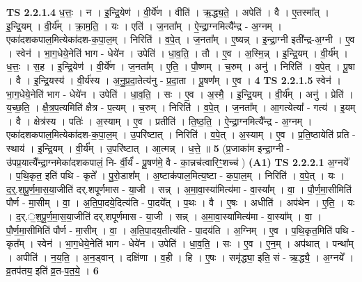 \documentclass[17pt]{extarticle}
\begin{document}
                  \newline
                                \textbf{ TS 2.2.1.4} \newline
                  ध॒त्तः॒ । न । इ॒न्द्रि॒येण॑ । वी॒र्ये॑ण । वीति॑ । ऋ॒द्ध्य॒ते॒ । अपेति॑ । वै । ए॒तस्मा᳚त् । इ॒न्द्रि॒यम् । वी॒र्य᳚म् । क्रा॒म॒ति॒ । यः । एति॑ । ज॒नता᳚म् । ऐ॒न्द्रा॒ग्नमित्यै᳚न्द्र - अ॒ग्नम् । एका॑दशकपाल॒मित्येका॑दश-क॒पा॒ल॒म् । निरिति॑ । व॒पे॒त् । ज॒नता᳚म् । ए॒ष्यन्न् । इ॒न्द्रा॒ग्नी इती᳚न्द्र-अ॒ग्नी । ए॒व । स्वेन॑ । भा॒ग॒धेये॒नेति॑ भाग - धेये॑न । उपेति॑ । धा॒व॒ति॒ । तौ । ए॒व । अ॒स्मि॒न्न् । इ॒न्द्रि॒यम् । वी॒र्य᳚म् । ध॒त्तः॒ । स॒ह । इ॒न्द्रि॒येण॑ । वी॒र्ये॑ण । ज॒नता᳚म् । ए॒ति॒ । पौ॒ष्णम् । च॒रुम् । अनु॑ । निरिति॑ । व॒पे॒त् । पू॒षा । वै । इ॒न्द्रि॒यस्य॑ । वी॒र्य॑स्य । अ॒नु॒प्र॒दा॒तेत्य॑नु - प्र॒दा॒ता । पू॒षण᳚म् । ए॒व । \textbf{  4} \newline
                  \newline
                                \textbf{ TS 2.2.1.5} \newline
                  स्वेन॑ । भा॒ग॒धेये॒नेति॑ भाग - धेये॑न । उपेति॑ । धा॒व॒ति॒ । सः । ए॒व । अ॒स्मै॒ । इ॒न्द्रि॒यम् । वी॒र्य᳚म् । अनु॑ । प्रेति॑ । य॒च्छ॒ति॒ । क्षै॒त्र॒प॒त्यमिति॑ क्षैत्र - प॒त्यम् । च॒रुम् । निरिति॑ । व॒पे॒त् । ज॒नता᳚म् । आ॒गत्येत्या᳚ - गत्य॑ । इ॒यम् । वै । क्षेत्र॑स्य । पतिः॑ । अ॒स्याम् । ए॒व । प्रतीति॑ । ति॒ष्ठ॒ति॒ । ऐ॒न्द्रा॒ग्नमित्यै᳚न्द्र - अ॒ग्नम् । एका॑दशकपाल॒मित्येका॑दश-क॒पा॒ल॒म् । उ॒परि॑ष्टात् । निरिति॑ । व॒पे॒त् । अ॒स्याम् । ए॒व । प्र॒ति॒ष्ठायेति॑ प्रति - स्थाय॑ । इ॒न्द्रि॒यम् । वी॒र्य᳚म् । उ॒परि॑ष्टात् । आ॒त्मन्न् । ध॒त्ते॒ ॥ \textbf{  5} \newline
                  \newline
                      (प्र॒जाका॑म इन्द्रा॒ग्नी - उ॑पप्र॒यात्यै᳚न्द्रा॒ग्नमेका॑दशकपालं॒ नि- र्वी॒र्यं॑ - पू॒षण॑मे॒ वै - का॒न्नच॑त्वारिꣳ॒॒शच्च॑ )  \textbf{(A1)} \newline \newline
                                \textbf{ TS 2.2.2.1} \newline
                  अ॒ग्नये᳚ । प॒थि॒कृत॒ इति॑ पथि - कृते᳚ । पु॒रो॒डाश᳚म् । अ॒ष्टाक॑पाल॒मित्य॒ष्टा - क॒पा॒ल॒म् । निरिति॑ । व॒पे॒त् । यः । द॒र्॒.श॒पू॒र्ण॒मा॒स॒या॒जीति॑ दर्.शपूर्णमास - या॒जी । सन्न् । अ॒मा॒वा॒स्या॑मित्य॑मा - वा॒स्या᳚म् । वा॒ । पौ॒र्ण॒मा॒सीमिति॑ पौर्ण - मा॒सीम् । वा॒ । अ॒ति॒पा॒दये॒दित्य॑ति - पा॒दये᳚त् । प॒थः । वै । ए॒षः । अधीति॑ । अप॑थेन । ए॒ति॒ । यः । द॒र्.॒श॒पू॒र्ण॒मा॒स॒या॒जीति॑ दर्.शपूर्णमास - या॒जी । सन्न् । अ॒मा॒वा॒स्या॑मित्य॑मा - वा॒स्या᳚म् । वा॒ । पौ॒र्ण॒मा॒सीमिति॑ पौर्ण - मा॒सीम् । वा॒ । अ॒ति॒पा॒दय॒तीत्य॑ति - पा॒दय॑ति । अ॒ग्निम् । ए॒व । प॒थि॒कृत॒मिति॑ पथि - कृत᳚म् । स्वेन॑ । भा॒ग॒धेये॒नेति॑ भाग - धेये॑न । उपेति॑ । धा॒व॒ति॒ । सः । ए॒व । ए॒न॒म् । अप॑थात् । पन्था᳚म् । अपीति॑ । न॒य॒ति॒ । अ॒न॒ड्वान् । दक्षि॑णा । व॒ही । हि । ए॒षः । समृ॑द्ध्या॒ इति॒ सं - ऋ॒द्ध्यै॒ । अ॒ग्नये᳚ । व्र॒तप॑तय॒ इति॑ व्र॒त-प॒त॒ये॒ । \textbf{  6} \newline
\end{document}
